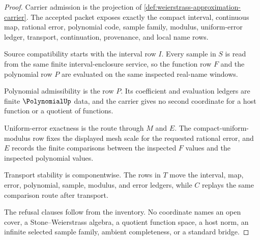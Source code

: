 \begin{proof}
Carrier admission is the projection of \autoref{def:weierstrass-approximation-carrier}. The accepted packet exposes exactly the compact interval, continuous map, rational error, polynomial code, sample family, modulus, uniform-error ledger, transport, continuation, provenance, and local name rows.

Source compatibility starts with the interval row $I$. Every sample in $S$ is read from the same finite interval-enclosure service, so the function row $F$ and the polynomial row $P$ are evaluated on the same inspected real-name windows.

Polynomial admissibility is the row $P$. Its coefficient and evaluation ledgers are finite $\PolynomialUp$ data, and the carrier gives no second coordinate for a host function or a quotient of functions.

Uniform-error exactness is the route through $M$ and $E$. The compact-uniform-modulus row fixes the displayed mesh scale for the requested rational error, and $E$ records the finite comparisons between the inspected $F$ values and the inspected polynomial values.

Transport stability is componentwise. The rows in $T$ move the interval, map, error, polynomial, sample, modulus, and error ledgers, while $C$ replays the same comparison route after transport.

The refusal clauses follow from the inventory. No coordinate names an open cover, a Stone--Weierstrass algebra, a quotient function space, a host norm, an infinite selected sample family, ambient completeness, or a standard bridge.
\end{proof}

